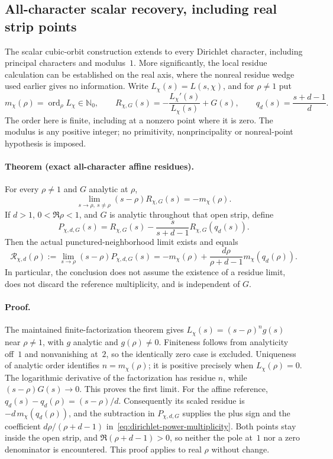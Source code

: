 \subsection{All-character scalar recovery, including real strip points}
\label{sec:dirichlet-scalar-orbit}

The scalar cubic-orbit construction extends to every Dirichlet character,
including principal characters and modulus~\(1\). More significantly, the
local residue calculation can be established on the real axis, where the
nonreal residue wedge used earlier gives no information.
Write \(L_\chi(s)=L(s,\chi)\), and for \(\rho\ne1\) put
\[
 m_\chi(\rho)=\operatorname{ord}_\rho L_\chi\in\mathbb N_0,
 \qquad R_{\chi,G}(s)=-\frac{L_\chi'(s)}{L_\chi(s)}+G(s),
 \qquad q_d(s)=\frac{s+d-1}{d}.
\]
The order here is finite, including at a nonzero point where it is zero.
The modulus is any positive integer; no primitivity, nonprincipality or
nonreal-point hypothesis is imposed.

\paragraph{Theorem (exact all-character affine residues).}
For every \(\rho\ne1\) and \(G\) analytic at \(\rho\),
\[
 \lim_{s\to\rho,\ s\ne\rho}(s-\rho)R_{\chi,G}(s)=-m_\chi(\rho).
\]
If \(d>1\), \(0<\Re\rho<1\), and \(G\) is analytic throughout that open
strip, define
\[
 P_{\chi,d,G}(s)=R_{\chi,G}(s)
       -\frac{s}{s+d-1}R_{\chi,G}(q_d(s)).
\]
Then the actual punctured-neighborhood limit exists and equals
\begin{equation}
 \mathcal R_{\chi,d}(\rho)
 :=\lim_{s\to\rho}(s-\rho)P_{\chi,d,G}(s)
 =-m_\chi(\rho)
   +\frac{d\rho}{\rho+d-1}m_\chi(q_d(\rho)).
 \label{eq:dirichlet-power-multiplicity}
\end{equation}
In particular, the conclusion does not assume the existence of a residue
limit, does not discard the reference multiplicity, and is independent of
\(G\).

\paragraph{Proof.}
The maintained finite-factorization theorem gives
\(L_\chi(s)=(s-\rho)^n g(s)\) near \(\rho\ne1\), with \(g\) analytic
and \(g(\rho)\ne0\). Finiteness follows from analyticity off~\(1\) and
nonvanishing at~\(2\), so the identically zero case is excluded. Uniqueness
of analytic order identifies \(n=m_\chi(\rho)\); it is positive precisely
when \(L_\chi(\rho)=0\). The logarithmic derivative of the factorization
has residue \(n\), while \((s-\rho)G(s)\to0\). This proves the first
limit. For the affine reference, \(q_d(s)-q_d(\rho)=(s-\rho)/d\).
Consequently its scaled residue is \(-d\,m_\chi(q_d(\rho))\), and the
subtraction in \(P_{\chi,d,G}\) supplies the plus sign and the coefficient
\(d\rho/(\rho+d-1)\) in~\eqref{eq:dirichlet-power-multiplicity}.
Both points stay inside the open strip, and \(\Re(\rho+d-1)>0\), so neither
the pole at~\(1\) nor a zero denominator is encountered. This proof applies
to real \(\rho\) without change.

